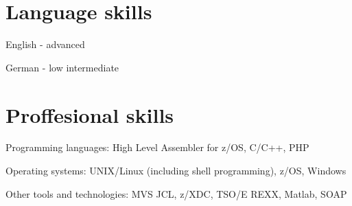 \documentclass[11pt,letterpaper]{article}
\renewenvironment{itemize}{
  \begin{list}{}{
    \setlength{\leftmargin}{0.5em}
  }
}{
  \end{list}
}
\begin{document}
\section*{Language skills}

\begin{itemize}
  \item English - advanced
  \item German - low intermediate
\end{itemize}


\section*{Proffesional skills}
\begin{itemize}
  \item Programming languages: High Level Assembler for z/OS, C/C++, PHP	
  \item Operating systems: UNIX/Linux (including shell programming), z/OS, Windows
  \item Other tools and technologies: MVS JCL, z/XDC, TSO/E REXX, Matlab, SOAP
\end{itemize}

\end{document}
